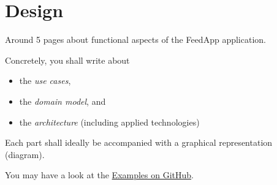 \section{Design}
\label{sec:design}

Around 5 pages about functional aspects of the FeedApp application.

Concretely, you shall write about 

\begin{itemize}
	\item the \emph{use cases},
	\item the \emph{domain model}, and
	\item the \emph{architecture} (including applied technologies)
\end{itemize}

Each part shall ideally be accompanied with a graphical representation (diagram).

You may have a look at the \href{https://github.com/selabhvl/dat250public/blob/master/projectdescription/README.md}{Examples on GitHub}.

